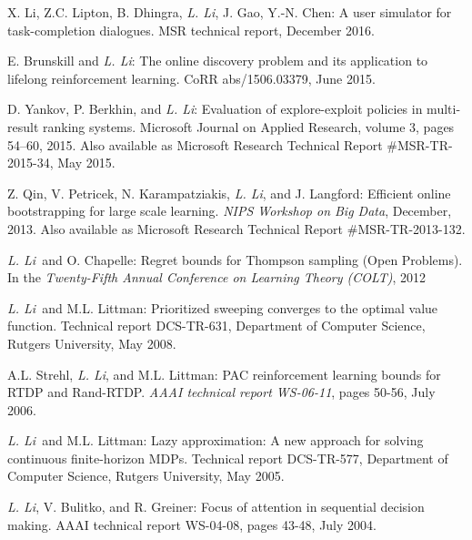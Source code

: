 \documentclass[10pt,twoside,letterpaper]{article}
\newcommand{\selffont}[1]{{\textit{#1}}}
\newcommand{\venuefont}[1]{{\textit{#1}}}
\newcommand{\negitemspace}{\vspace{1mm}}
\newcommand{\myself}{\selffont{L. Li}}
\begin{document}
\begin{compactenum}[(O1)]

\item{X. Li, Z.C. Lipton, B. Dhingra, \myself, J. Gao, Y.-N. Chen: A user simulator for task-completion dialogues.  MSR technical report, December 2016.}

\item{E. Brunskill and \myself: The online discovery problem and its application to lifelong reinforcement learning.  CoRR abs/1506.03379, June 2015.}

\item{D. Yankov, P. Berkhin, and \myself: Evaluation of explore-exploit policies in multi-result ranking systems.  Microsoft Journal on Applied Research, volume 3, pages 54--60, 2015.  Also available as Microsoft Research Technical Report \#MSR-TR-2015-34, May 2015.}

\item{Z. Qin, V. Petricek, N. Karampatziakis, \myself, and J. Langford: Efficient online bootstrapping for large scale learning.  \venuefont{NIPS Workshop on Big Data}, December, 2013.  Also available as Microsoft Research Technical Report \#MSR-TR-2013-132.}

\item{\myself\ and O. Chapelle: Regret bounds for Thompson sampling (Open Problems).  In the \venuefont{Twenty-Fifth Annual Conference on Learning Theory (COLT)}, 2012}

\item{\myself\ and M.L. Littman: Prioritized sweeping converges to the optimal value function.  Technical report DCS-TR-631, Department of Computer Science, Rutgers University, May 2008.}

\item{A.L. Strehl, \myself, and M.L. Littman: PAC reinforcement learning bounds for RTDP and Rand-RTDP.  \venuefont{AAAI technical report WS-06-11}, pages 50-56, July 2006.}

\item{\myself\ and M.L. Littman: Lazy approximation: A new approach for solving continuous finite-horizon MDPs.  Technical report DCS-TR-577, Department of Computer Science, Rutgers University, May 2005.}

\item{\myself, V. Bulitko, and R. Greiner: Focus of attention in sequential decision making. AAAI technical report WS-04-08, pages 43-48, July 2004.}

\end{compactenum} \negitemspace
\end{document}
